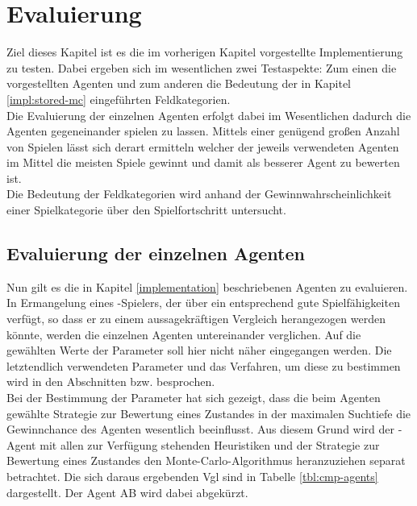 \chapter{Evaluierung}
Ziel dieses Kapitel ist es die im vorherigen Kapitel vorgestellte Implementierung zu testen. Dabei ergeben sich im wesentlichen zwei Testaspekte: Zum einen die vorgestellten Agenten und zum anderen die Bedeutung der in Kapitel \ref{impl:stored-mc} eingeführten Feldkategorien.
\vspace{0.5cm}
\\Die Evaluierung der einzelnen Agenten erfolgt dabei im Wesentlichen dadurch die Agenten gegeneinander spielen zu lassen. Mittels einer genügend großen Anzahl von Spielen lässt sich derart ermitteln welcher der jeweils verwendeten Agenten im Mittel die meisten Spiele gewinnt und damit als besserer Agent zu bewerten ist.
\\Die Bedeutung der Feldkategorien wird anhand der Gewinnwahrscheinlichkeit einer Spielkategorie über den Spielfortschritt untersucht.
\section{Evaluierung der einzelnen Agenten}
\label{cpt:eval-agents}
Nun gilt es die in Kapitel \ref{implementation} beschriebenen Agenten zu evaluieren. In Ermangelung eines \ot-Spielers, der über ein entsprechend gute Spielfähigkeiten verfügt, so dass er zu einem aussagekräftigen Vergleich herangezogen werden könnte, werden die einzelnen Agenten untereinander verglichen. Auf die gewählten Werte der Parameter soll hier nicht näher eingegangen werden. Die letztendlich verwendeten Parameter und das Verfahren, um diese zu bestimmen wird in den Abschnitten  bzw.  besprochen.
\\Bei der Bestimmung der Parameter hat sich gezeigt, dass die beim Agenten \mxZitat{\abp} gewählte Strategie zur Bewertung eines Zustandes in der maximalen Suchtiefe die Gewinnchance des Agenten wesentlich beeinflusst. Aus diesem Grund wird der \mxZitat{\abp}-Agent mit allen zur Verfügung stehenden Heuristiken und der Strategie zur Bewertung eines Zustandes den Monte-Carlo-Algorithmus heranzuziehen separat betrachtet. Die sich daraus ergebenden \ac{Vgl} sind in Tabelle \ref{tbl:cmp-agents} dargestellt. Der Agent \ac{AB} wird dabei abgekürzt.

